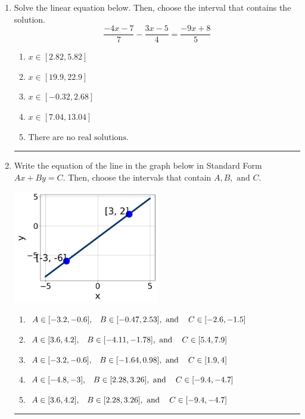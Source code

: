 \documentclass[14pt]{extbook}
\newcommand{\litem}[1]{\item#1\hspace*{-1cm}\rule{\textwidth}{0.4pt}}
\begin{document}
\begin{enumerate}
\litem{
Solve the linear equation below. Then, choose the interval that contains the solution.\[ \frac{-4x -7}{7} - \frac{3x -5}{4} = \frac{-9x + 8}{5} \]\begin{enumerate}[label=\Alph*.]
\item \( x \in [2.82, 5.82] \)
\item \( x \in [19.9, 22.9] \)
\item \( x \in [-0.32, 2.68] \)
\item \( x \in [7.04, 13.04] \)
\item \( \text{There are no real solutions.} \)

\end{enumerate} }
\litem{
Write the equation of the line in the graph below in Standard Form $Ax+By=C$. Then, choose the intervals that contain $A, B, \text{ and } C$.
\begin{center}
    \includegraphics[width=0.5\textwidth]{../Figures/linearGraphToStandardCopyB.png}
\end{center}
\begin{enumerate}[label=\Alph*.]
\item \( A \in [-3.2, -0.6], \hspace{3mm} B \in [-0.47, 2.53], \text{ and } \hspace{3mm} C \in [-2.6, -1.5] \)
\item \( A \in [3.6, 4.2], \hspace{3mm} B \in [-4.11, -1.78], \text{ and } \hspace{3mm} C \in [5.4, 7.9] \)
\item \( A \in [-3.2, -0.6], \hspace{3mm} B \in [-1.64, 0.98], \text{ and } \hspace{3mm} C \in [1.9, 4] \)
\item \( A \in [-4.8, -3], \hspace{3mm} B \in [2.28, 3.26], \text{ and } \hspace{3mm} C \in [-9.4, -4.7] \)
\item \( A \in [3.6, 4.2], \hspace{3mm} B \in [2.28, 3.26], \text{ and } \hspace{3mm} C \in [-9.4, -4.7] \)


\end{enumerate}}
\end{enumerate}
\end{document}
